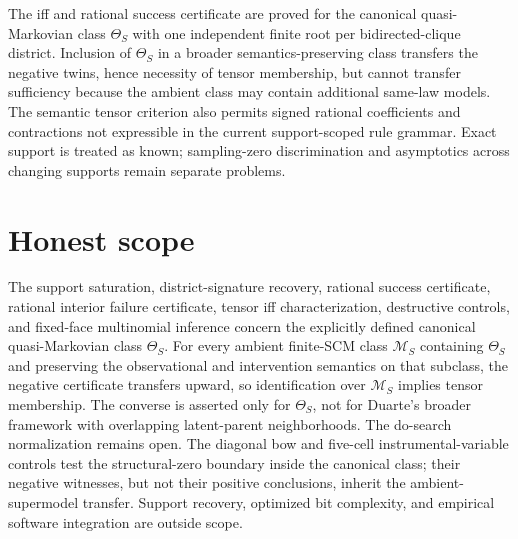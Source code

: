 \documentclass{article}
\begin{document}
The iff and rational success certificate are proved for the canonical quasi-Markovian class \(\Theta_S\) with one independent finite root per bidirected-clique district. Inclusion of \(\Theta_S\) in a broader semantics-preserving class transfers the negative twins, hence necessity of tensor membership, but cannot transfer sufficiency because the ambient class may contain additional same-law models. The semantic tensor criterion also permits signed rational coefficients and contractions not expressible in the current support-scoped rule grammar. Exact support is treated as known; sampling-zero discrimination and asymptotics across changing supports remain separate problems.

\section{Honest scope}

The support saturation, district-signature recovery, rational success certificate, rational interior failure certificate, tensor iff characterization, destructive controls, and fixed-face multinomial inference concern the explicitly defined canonical quasi-Markovian class \(\Theta_S\). For every ambient finite-SCM class \(\mathcal M_S\) containing \(\Theta_S\) and preserving the observational and intervention semantics on that subclass, the negative certificate transfers upward, so identification over \(\mathcal M_S\) implies tensor membership. The converse is asserted only for \(\Theta_S\), not for Duarte's broader framework with overlapping latent-parent neighborhoods. The do-search normalization remains open. The diagonal bow and five-cell instrumental-variable controls test the structural-zero boundary inside the canonical class; their negative witnesses, but not their positive conclusions, inherit the ambient-supermodel transfer. Support recovery, optimized bit complexity, and empirical software integration are outside scope.
\end{document}

